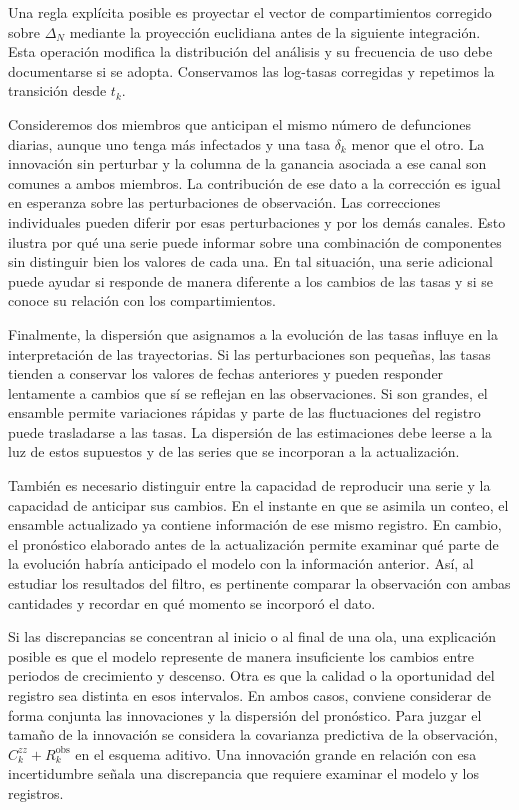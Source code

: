 Una regla explícita posible es proyectar el vector de compartimientos corregido sobre $\Delta_N$ mediante la proyección euclidiana antes de la siguiente integración. Esta operación modifica la distribución del análisis y su frecuencia de uso debe documentarse si se adopta. Conservamos las log-tasas corregidas y repetimos la transición desde $t_k$.

Consideremos dos miembros que anticipan el mismo número de defunciones diarias, aunque uno tenga más infectados y una tasa $\delta_k$ menor que el otro. La innovación sin perturbar y la columna de la ganancia asociada a ese canal son comunes a ambos miembros. La contribución de ese dato a la corrección es igual en esperanza sobre las perturbaciones de observación. Las correcciones individuales pueden diferir por esas perturbaciones y por los demás canales. Esto ilustra por qué una serie puede informar sobre una combinación de componentes sin distinguir bien los valores de cada una. En tal situación, una serie adicional puede ayudar si responde de manera diferente a los cambios de las tasas y si se conoce su relación con los compartimientos.

Finalmente, la dispersión que asignamos a la evolución de las tasas influye en la interpretación de las trayectorias. Si las perturbaciones son pequeñas, las tasas tienden a conservar los valores de fechas anteriores y pueden responder lentamente a cambios que sí se reflejan en las observaciones. Si son grandes, el ensamble permite variaciones rápidas y parte de las fluctuaciones del registro puede trasladarse a las tasas. La dispersión de las estimaciones debe leerse a la luz de estos supuestos y de las series que se incorporan a la actualización.

También es necesario distinguir entre la capacidad de reproducir una serie y la capacidad de anticipar sus cambios. En el instante en que se asimila un conteo, el ensamble actualizado ya contiene información de ese mismo registro. En cambio, el pronóstico elaborado antes de la actualización permite examinar qué parte de la evolución habría anticipado el modelo con la información anterior. Así, al estudiar los resultados del filtro, es pertinente comparar la observación con ambas cantidades y recordar en qué momento se incorporó el dato.

Si las discrepancias se concentran al inicio o al final de una ola, una explicación posible es que el modelo represente de manera insuficiente los cambios entre periodos de crecimiento y descenso. Otra es que la calidad o la oportunidad del registro sea distinta en esos intervalos. En ambos casos, conviene considerar de forma conjunta las innovaciones y la dispersión del pronóstico. Para juzgar el tamaño de la innovación se considera la covarianza predictiva de la observación, $C_k^{zz}+R_k^{\mathrm{obs}}$ en el esquema aditivo. Una innovación grande en relación con esa incertidumbre señala una discrepancia que requiere examinar el modelo y los registros.


